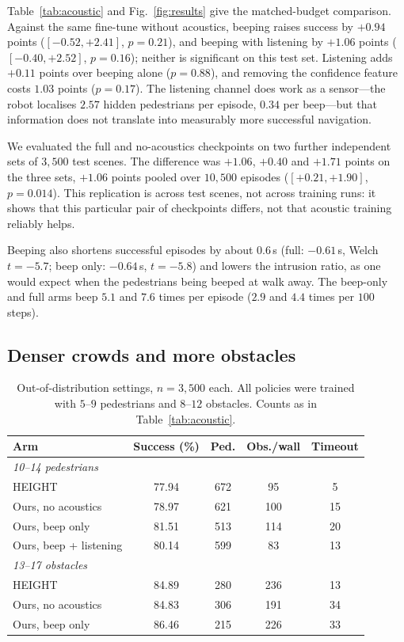 \documentclass[conference]{IEEEtran}
\begin{document}
Table~\ref{tab:acoustic} and Fig.~\ref{fig:results} give the matched-budget comparison. Against
the same fine-tune without acoustics, beeping raises success by $+0.94$ points
($[-0.52,+2.41]$, $p=0.21$), and beeping with listening by $+1.06$ points ($[-0.40,+2.52]$,
$p=0.16$); neither is significant on this test set. Listening adds $+0.11$ points over beeping
alone ($p=0.88$), and removing the confidence feature costs $1.03$ points ($p=0.17$). The
listening channel does work as a sensor---the robot localises $2.57$ hidden pedestrians per
episode, $0.34$ per beep---but that information does not translate into measurably more
successful navigation.

We evaluated the full and no-acoustics checkpoints on two further independent sets of
$3{,}500$ test scenes. The difference was $+1.06$, $+0.40$ and $+1.71$ points on the three sets,
$+1.06$ points pooled over $10{,}500$ episodes ($[+0.21,+1.90]$, $p=0.014$). This replication is
across test scenes, not across training runs: it shows that this particular pair of checkpoints
differs, not that acoustic training reliably helps.

Beeping also shortens successful episodes by about $0.6$\,s (full: $-0.61$\,s, Welch
$t=-5.7$; beep only: $-0.64$\,s, $t=-5.8$) and lowers the intrusion ratio, as one would expect
when the pedestrians being beeped at walk away. The beep-only and full arms beep $5.1$ and $7.6$
times per episode ($2.9$ and $4.4$ times per $100$ steps).

\subsection{Denser crowds and more obstacles}
\begin{table}[t]
\caption{Out-of-distribution settings, $n=3{,}500$ each. All policies were trained with $5$--$9$
pedestrians and $8$--$12$ obstacles. Counts as in Table~\ref{tab:acoustic}.}
\label{tab:gen}
\centering
\begin{tabular}{lcccc}
\toprule
Arm & Success (\%) & Ped. & Obs./wall & Timeout \\
\midrule
\multicolumn{5}{l}{\textit{10--14 pedestrians}} \\
HEIGHT & 77.94 & 672 & 95 & 5 \\
Ours, no acoustics & 78.97 & 621 & 100 & 15 \\
Ours, beep only & 81.51 & 513 & 114 & 20 \\
Ours, beep + listening & 80.14 & 599 & 83 & 13 \\
\midrule
\multicolumn{5}{l}{\textit{13--17 obstacles}} \\
HEIGHT & 84.89 & 280 & 236 & 13 \\
Ours, no acoustics & 84.83 & 306 & 191 & 34 \\
Ours, beep only & 86.46 & 215 & 226 & 33 \\
\bottomrule
\end{tabular}
\end{table}
\end{document}
